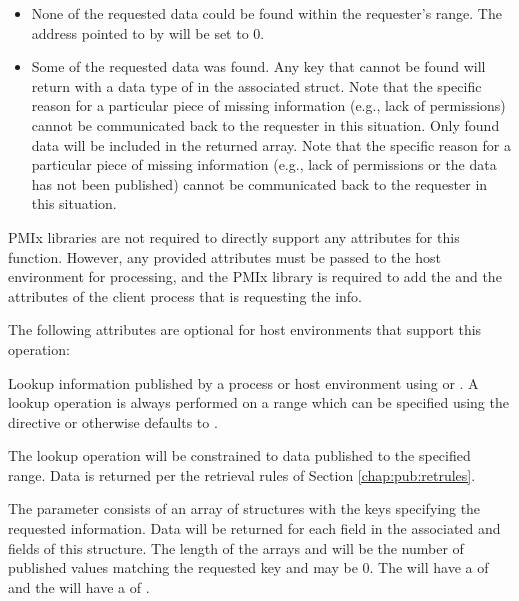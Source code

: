 \returnstart
\begin{itemize}
\item {} None of the requested data could be found within the requester's range.  The address pointed to by  will be set to 0.

\item {} Some of the requested data was found.  
Any key that cannot be found will return with a data type of  in the associated  struct. Note that the specific reason for a particular piece of missing information (e.g., lack of permissions) cannot be communicated back to the requester in this situation.
Only found data will be included in the returned  array. Note that the specific reason for a particular piece of missing information (e.g., lack of permissions or the data has not been published) cannot be communicated back to the requester in this situation.

\end{itemize}
\returnend

\reqattrstart
\ac{PMIx} libraries are not required to directly support any attributes for this function. However, any provided attributes must be passed to the host environment for processing, and the \ac{PMIx} library is required to add the  and the  attributes of the client process that is requesting the info.

\reqattrend

\optattrstart
The following attributes are optional for host environments that support this operation:


\optattrend

\descr

Lookup information published by a process or host environment using  
or .
A lookup operation is always performed on a range which can be specified using the directive  or otherwise defaults to .

The lookup operation will be constrained to data published to the specified range.
Data is returned per the retrieval rules of Section \ref{chap:pub:retrules}.

The  parameter consists of an array of  structures with the keys specifying the requested information.
Data will be returned for each  field in the associated  and  fields of this structure.
The length of the arrays  and  will be the number of published values matching the requested
key and may be 0.  The   will have a  of  
and the   will have a  of .

